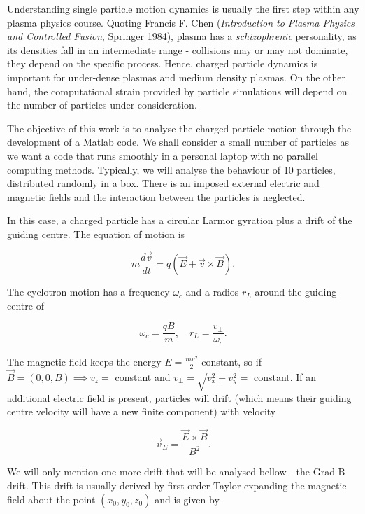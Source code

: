 Understanding single particle motion dynamics is usually the first step within any plasma physics course. Quoting Francis F. Chen (\textit{Introduction to Plasma Physics and Controlled Fusion}, Springer 1984), plasma has a \textit{schizophrenic} personality, as its densities fall in an intermediate range - collisions may or may not dominate, they depend on the specific process. Hence, charged particle dynamics is important for under-dense plasmas and medium density plasmas. On the other hand, the computational strain provided by particle simulations will depend on the number of particles under consideration.

The objective of this work is to analyse the charged particle motion through the development of a Matlab code. We shall consider a small number of particles as we want a code that runs smoothly in a personal laptop with no parallel computing methods. Typically, we will analyse the behaviour of 10 particles, distributed randomly in a box. There is an imposed external electric and magnetic fields and the interaction between the particles is neglected.

In this case, a charged particle has a circular Larmor gyration plus a drift of the guiding centre. The equation of motion is

\begin{equation}
m\frac{d \vec v}{dt}=q(\vec E+\vec v \times \vec B).
\end{equation}

The cyclotron motion has a frequency $\omega_c$ and a radios $r_L$ around the guiding centre of

\begin{equation}
\omega_c = \frac{q B}{m}, \quad r_L = \frac{v_\perp}{\omega_c}.
\end{equation}

The magnetic field keeps the energy $E = \frac{m v^2}{2}$ constant, so if $\vec B=(0,0,B) \implies v_z=$ constant and $v_\perp=\sqrt{v_x^2+v_y^2}=$ constant. If an additional electric field is present, particles will drift (which means their guiding centre velocity will have a new finite component) with velocity

\begin{equation}
\vec v_E=\frac{\vec E \times \vec B}{B^2}.
\end{equation}

We will only mention one more drift that will be analysed bellow - the Grad-B drift. This drift is usually derived by first order Taylor-expanding the magnetic field about the point $(x_0,y_0,z_0)$ and is given by

